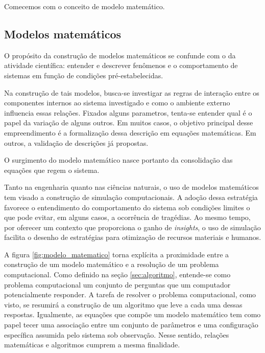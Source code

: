 Comecemos com o conceito de modelo matemático.

\subsection{Modelos matemáticos}

O propósito da construção de modelos matemáticos se confunde com o da atividade científica: entender e descrever fenômenos e o comportamento de sistemas em função de condições pré-estabelecidas.
 
Na construção de tais modelos, busca-se investigar as regras de interação entre os componentes internos ao sistema investigado e como o ambiente externo influencia essas relações. Fixados alguns parametros, tenta-se entender qual é o papel da variação de alguns outros. Em muitos casos, o objetivo principal desse empreendimento é a formalização dessa descrição em equações matemáticas. Em outros, a validação de descrições já propostas. 

O surgimento do modelo matemático nasce portanto da consolidação das equações que regem o sistema.

Tanto na engenharia quanto nas ciências naturais, o uso de modelos matemáticos tem visado a construção de simulação computacionais. A adoção dessa estratégia favorece o entendimento do comportamento do sistema sob condições limites o que pode evitar, em alguns casos, a ocorrência de tragédias. Ao mesmo tempo, por oferecer um contexto que proporciona o ganho de \textit{insights}, o uso de simulação facilita o desenho de estratégias para otimização de recursos materiais e humanos. 

A figura \ref{fig:modelo_matematico} torna explícita a proximidade entre a construção de um modelo matemático e a resolução de um problema computacional. Como definido na seção \ref{sec:algoritmo}, entende-se como problema computacional um conjunto de perguntas que um computador potencialmente  responder. A tarefa de resolver o problema computacional, como visto, se resumirá a construção de um algoritmo que leve a cada uma dessas respostas. Igualmente, as equações que compõe um modelo matemático tem como papel tecer uma associação entre um conjunto de parâmetros e uma configuração específica assumida pelo sistema sob observação. Nesse sentido, relações matemáticas e algoritmos cumprem a mesma finalidade.

